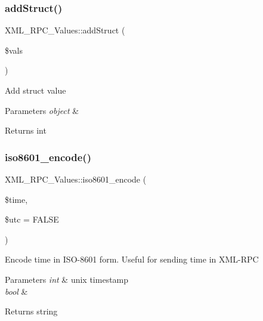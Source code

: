 \subsubsection{\texorpdfstring{add\+Struct()}{addStruct()}}
{\footnotesize\ttfamily X\+M\+L\+\_\+\+R\+P\+C\+\_\+\+Values\+::add\+Struct (\begin{DoxyParamCaption}\item[{}]{\$vals }\end{DoxyParamCaption})}

Add struct value


\begin{DoxyParams}{Parameters}
{\em object} & \\
\hline
\end{DoxyParams}
\begin{DoxyReturn}{Returns}
int 
\end{DoxyReturn}
\mbox{\label{class_x_m_l___r_p_c___values_a089ae76d71c66d3a7c4f19f0b5890ec5}} 
\subsubsection{\texorpdfstring{iso8601\+\_\+encode()}{iso8601\_encode()}}
{\footnotesize\ttfamily X\+M\+L\+\_\+\+R\+P\+C\+\_\+\+Values\+::iso8601\+\_\+encode (\begin{DoxyParamCaption}\item[{}]{\$time,  }\item[{}]{\$utc = {\ttfamily FALSE} }\end{DoxyParamCaption})}

Encode time in I\+S\+O-\/8601 form. Useful for sending time in X\+M\+L-\/\+R\+PC


\begin{DoxyParams}{Parameters}
{\em int} & unix timestamp \\
\hline
{\em bool} & \\
\hline
\end{DoxyParams}
\begin{DoxyReturn}{Returns}
string 
\end{DoxyReturn}
\mbox{\label{class_x_m_l___r_p_c___values_a9daa1f725059a6618ded9e59b2188793}} 
